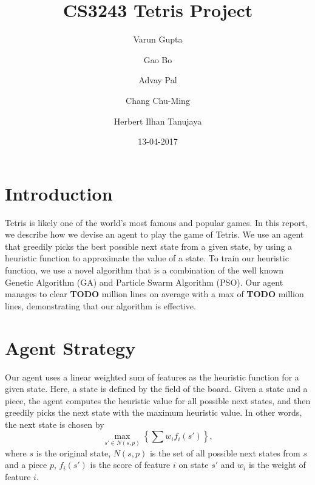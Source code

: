 \documentclass{article}
\title{CS3243 Tetris Project}
\author{Varun Gupta \and Gao Bo \and Advay Pal \and Chang Chu-Ming \and Herbert Ilhan Tanujaya}
\date{13-04-2017}
\begin{document}
	\maketitle
	\thispagestyle{empty}
	\vspace{5mm}

    \section{Introduction}
    Tetris is likely one of the world's most famous and popular games.
    In this report, we describe how we devise an agent to play the game of Tetris.
    We use an agent that greedily picks the best possible next state from a given state,
    by using a heuristic function to approximate the value of a state. To train our heuristic
    function, we use a novel algorithm that is a combination of the well known Genetic Algorithm (GA)
    and Particle Swarm Algorithm (PSO). Our agent manages to clear \textbf{TODO} million lines on average with a max
    of \textbf{TODO} million lines, demonstrating that our algorithm is effective.

    \section{Agent Strategy}
	Our agent uses a linear weighted sum of features as the heuristic function for
	a given state. Here, a state is defined by the field of the board. Given a
	state and a piece, the agent computes the heuristic value for all possible next
	states, and then greedily picks the next state with the maximum heuristic
	value. In other words, the next state is chosen by \[ \max_{s' \in N(s, p)}
	\left\{ \sum w_i f_i(s') \right\}, \] where $s$ is the original state, $N(s,
	p)$ is the set of all possible next states from $s$ and a piece $p$, $f_i(s')$
	is the score of feature $i$ on state $s'$ and $w_i$ is the weight of feature
	$i$.
\end{document}
